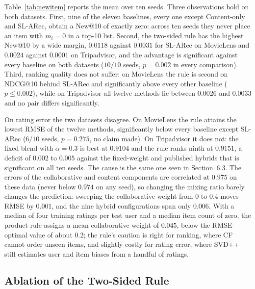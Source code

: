 Table~\ref{tab:newitem} reports the mean over ten seeds. Three observations hold on both datasets. First, nine of the eleven baselines, every one except Content-only and SL-ARec, obtain a New@10 of exactly zero: across ten seeds they never place an item with $m_i = 0$ in a top-10 list. Second, the two-sided rule has the highest New@10 by a wide margin, $0.0118$ against $0.0031$ for SL-ARec on MovieLens and $0.0024$ against $0.0001$ on Tripadvisor, and the advantage is significant against every baseline on both datasets ($10/10$ seeds, $p = 0.002$ in every comparison). Third, ranking quality does not suffer: on MovieLens the rule is second on NDCG@10 behind SL-ARec and significantly above every other baseline ($p \le 0.002$), while on Tripadvisor all twelve methods lie between $0.0026$ and $0.0033$ and no pair differs significantly.

On rating error the two datasets disagree. On MovieLens the rule attains the lowest RMSE of the twelve methods, significantly below every baseline except SL-ARec ($6/10$ seeds, $p = 0.275$, no claim made). On Tripadvisor it does not: the fixed blend with $\alpha = 0.3$ is best at $0.9104$ and the rule ranks ninth at $0.9151$, a deficit of $0.002$ to $0.005$ against the fixed-weight and published hybrids that is significant on all ten seeds. The cause is the same one seen in Section~6.3. The errors of the collaborative and content components are correlated at $0.975$ on these data (never below $0.974$ on any seed), so changing the mixing ratio barely changes the prediction: sweeping the collaborative weight from $0$ to $0.4$ moves RMSE by $0.001$, and the nine hybrid configurations span only $0.006$. With a median of four training ratings per test user and a median item count of zero, the product rule assigns a mean collaborative weight of $0.045$, below the RMSE-optimal value of about $0.2$; the rule's caution is right for ranking, where CF cannot order unseen items, and slightly costly for rating error, where SVD++ still estimates user and item biases from a handful of ratings.

\subsection{Ablation of the Two-Sided Rule}
\label{sec:newitem-ablation}

